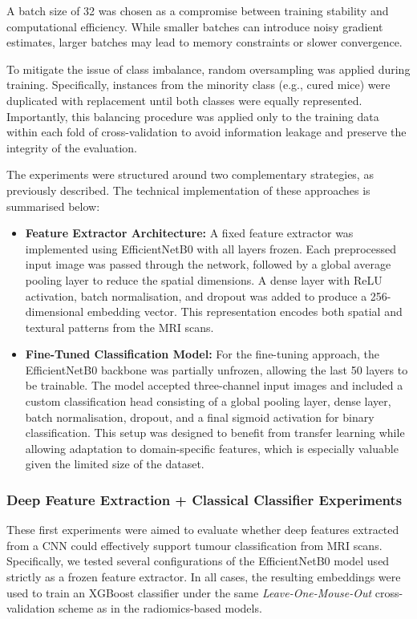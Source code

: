 \documentclass[12pt, a4paper]{report}
\begin{document}
A batch size of 32 was chosen as a compromise between training stability and computational efficiency. While smaller batches can introduce noisy gradient estimates, larger batches may lead to memory constraints or slower convergence.

To mitigate the issue of class imbalance, random oversampling was applied during training. Specifically, instances from the minority class (e.g., cured mice) were duplicated with replacement until both classes were equally represented. Importantly, this balancing procedure was applied only to the training data within each fold of cross-validation to avoid information leakage and preserve the integrity of the evaluation.

The experiments were structured around two complementary strategies, as previously described. The technical implementation of these approaches is summarised below:

\begin{itemize}
    \item \textbf{Feature Extractor Architecture:} A fixed feature extractor was implemented using EfficientNetB0 with all layers frozen. Each preprocessed input image was passed through the network, followed by a global average pooling layer to reduce the spatial dimensions. A dense layer with ReLU activation, batch normalisation, and dropout was added to produce a 256-dimensional embedding vector. This representation encodes both spatial and textural patterns from the MRI scans.
    \item \textbf{Fine-Tuned Classification Model:} For the fine-tuning approach, the EfficientNetB0 backbone was partially unfrozen, allowing the last 50 layers to be trainable. The model accepted three-channel input images and included a custom classification head consisting of a global pooling layer, dense layer, batch normalisation, dropout, and a final sigmoid activation for binary classification. This setup was designed to benefit from transfer learning while allowing adaptation to domain-specific features, which is especially valuable given the limited size of the dataset.
\end{itemize}

\subsubsection{Deep Feature Extraction + Classical Classifier Experiments}

These first experiments were aimed to evaluate whether deep features extracted from a CNN could effectively support tumour classification from MRI scans. Specifically, we tested several configurations of the EfficientNetB0 model used strictly as a frozen feature extractor. In all cases, the resulting embeddings were used to train an XGBoost classifier under the same \textit{Leave-One-Mouse-Out} cross-validation scheme as in the radiomics-based models.
\end{document}
